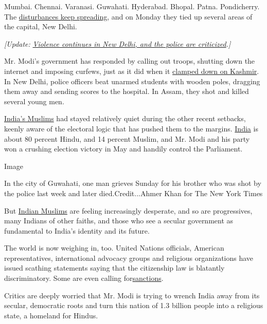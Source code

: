 Mumbai. Chennai. Varanasi. Guwahati. Hyderabad. Bhopal. Patna.
Pondicherry. The
\href{https://www.nytimes.com/2019/12/16/world/asia/india-citizenship-protests.html?action=click\&module=Top\%20Stories\&pgtype=Homepage}{disturbances
keep spreading}, and on Monday they tied up several areas of the
capital, New Delhi.

\emph{{[}Update:}
\href{http://www.nytimes.com/2020/02/27/world/asia/india-violence-hindu-muslim.html}{\emph{Violence
continues in New Delhi, and the police are criticized}}\emph{.{]}}

Mr. Modi's government has responded by calling out troops, shutting down
the internet and imposing curfews, just as it did when it
\href{https://www.nytimes.com/2019/08/10/world/asia/kashmir-india-pakistan.html}{clamped
down on Kashmir}. In New Delhi, police officers beat unarmed students
with wooden poles, dragging them away and sending scores to the
hospital. In Assam, they shot and killed several young men.

\href{https://www.nytimes.com/2019/12/17/world/asia/india-internet-modi-protests.html}{India's
Muslims} had stayed relatively quiet during the other recent setbacks,
keenly aware of the electoral logic that has pushed them to the margins.
\href{https://www.nytimes.com/2019/12/17/world/asia/india-internet-modi-protests.html}{India}
is about 80 percent Hindu, and 14 percent Muslim, and Mr. Modi and his
party won a crushing election victory in May and handily control the
Parliament.

Image

In the city of Guwahati, one man grieves Sunday for his brother who was
shot by the police last week and later died.Credit...Ahmer Khan for The
New York Times

But
\href{https://www.nytimes.com/2019/12/17/world/asia/india-internet-modi-protests.html}{Indian
Muslims} are feeling increasingly desperate, and so are progressives,
many Indians of other faiths, and those who see a secular government as
fundamental to India's identity and its future.

The world is now weighing in, too. United Nations officials, American
representatives, international advocacy groups and religious
organizations have issued scathing statements saying that the
citizenship law is blatantly discriminatory. Some are even calling
for\href{https://www.uscirf.gov/news-room/press-releases-statements/uscirf-raises-serious-concerns-and-eyes-sanctions}{sanctions}.

Critics are deeply worried that Mr. Modi is trying to wrench India away
from its secular, democratic roots and turn this nation of 1.3 billion
people into a religious state, a homeland for Hindus.

